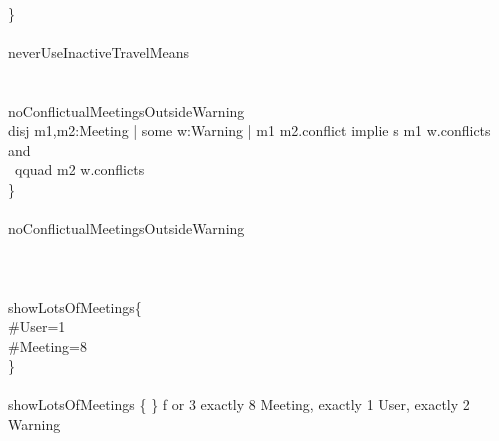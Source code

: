 {        \qquad \-\qquad \\
        \qquad \}\\
        \qquad \\
         neverUseInactiveTravelMeans\\
        \qquad \\
        \qquad \\
         noConflictualMeetingsOutsideWarning\                                                 {\\
        \qquad \- disj m1,m2:Meeting | {\color{b                                                 lue}some} w:Warning | m1  m2.conflict {\color{blue}implie                                                 s} m1  w.conflicts and\\
        \qquad \-\qquad \-\qquad \-\qquad \-\qquad \-\qquad \-\qquad \-\                                                 qquad \-\qquad m2  w.conflicts\\
        \qquad \}\\
        \qquad \\
         noConflictualMeetingsOutsideWarning\\
        \qquad \\
        \\
        \qquad \\
         showLotsOfMeetings\{\\
        \qquad \-\qquad \#User=1\\
        \qquad \-\qquad \#Meeting=8\\
        \qquad \}\\
        \qquad \\
         showLotsOfMeetings \{ \} {\color{blue}f                                                 or} 3  exactly 8 \qquad Meeting, {\color{blue}exactly} 1                                                  \qquad User, {\color{blue}exactly} 2 \qquad Warning\\
}}
